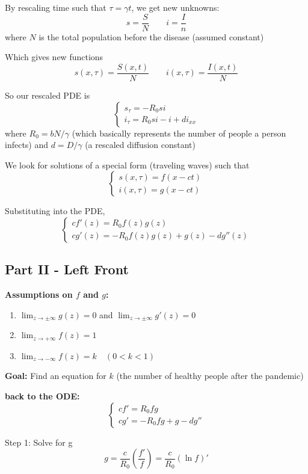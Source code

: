 \documentclass[12pt]{article}
\begin{document}
By rescaling time such that $\tau = \gamma t$, we get new unknowns:
\[s = \frac{S}{N} \qquad i = \frac{I}{n}\]
where $N$ is the total population before the disease (assumed constant)

Which gives new functions 
\[s(x, \tau) = \frac{S(x, t)}{N} \qquad i(x, \tau) = \frac{I(x, t)}{N}\]

So our rescaled PDE is 
\[\begin{cases}
    s_{\tau} = -R_0 si\\
    i_{\tau} = R_0 si - i + di_{xx}
\end{cases}\]
where $R_0 = bN/\gamma$ (which basically represents the number of people a person infects) and $d = D/\gamma$ (a rescaled diffusion constant)

We look for solutions of a special form (traveling waves) such that 
\[\begin{cases}
    s(x, \tau) = f(x - ct)\\
    i(x, \tau) = g(x - ct)
\end{cases}\]

Substituting into the PDE, 
\[\begin{cases}
    cf'(z) = R_0 f(z) g(z)\\
    cg'(z) = -R_0 f(z)g(z) + g(z) - dg''(z)
\end{cases}\]

\subsection*{Part II - Left Front}
\textbf{Assumptions on $f$ and $g$:}
\begin{enumerate}
    \item $\lim_{z \to \pm \infty} g(z) = 0$ and $\lim_{z \to \pm \infty} g'(z) = 0$
    \item $\lim_{z \to +\infty} f(z) = 1$
    \item $\lim_{z \to -\infty} f(z) = k \quad (0 < k < 1)$
\end{enumerate}

\textbf{Goal:} Find an equation for $k$ (the number of healthy people after the pandemic)

\textbf{back to the ODE:}
\[\begin{cases}
    cf' = R_0 fg\\
    cg' = -R_0 fg + g - dg''
\end{cases}\]

Step 1: Solve for g 
\[g = \frac{c}{R_0}\left(\frac{f'}{f}\right) = \frac{c}{R_0}(\ln f)'\]
\end{document}
